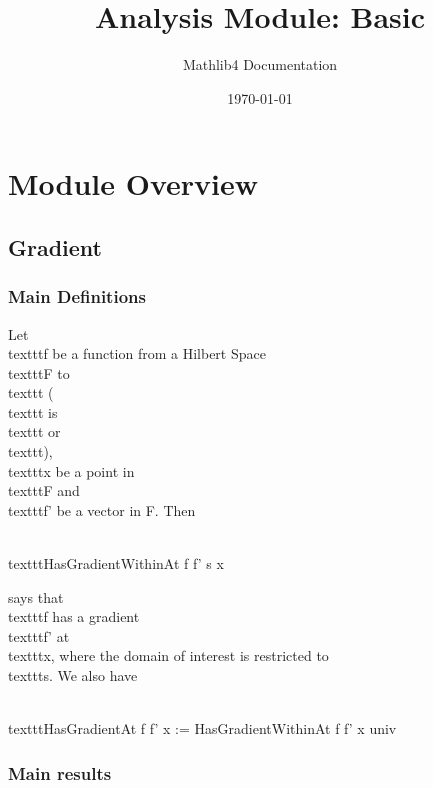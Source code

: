 \documentclass{article}
\title{Analysis Module: Basic}
\author{Mathlib4 Documentation}
\date{\today}
\theoremstyle{definition}
\begin{document}
\maketitle

\section{Module Overview}
\subsection{Gradient}

\subsubsection{Main Definitions}

Let \\texttt{f} be a function from a Hilbert Space \\texttt{F} to \\texttt{} (\\texttt{} is \\texttt{} or \\texttt{}), \\texttt{x} be a point in \\texttt{F}
and \\texttt{f'} be a vector in F. Then

  \\texttt{HasGradientWithinAt f f' s x}

says that \\texttt{f} has a gradient \\texttt{f'} at \\texttt{x}, where the domain of interest
is restricted to \\texttt{s}. We also have

  \\texttt{HasGradientAt f f' x := HasGradientWithinAt f f' x univ}

\subsubsection{Main results}
\end{document}
